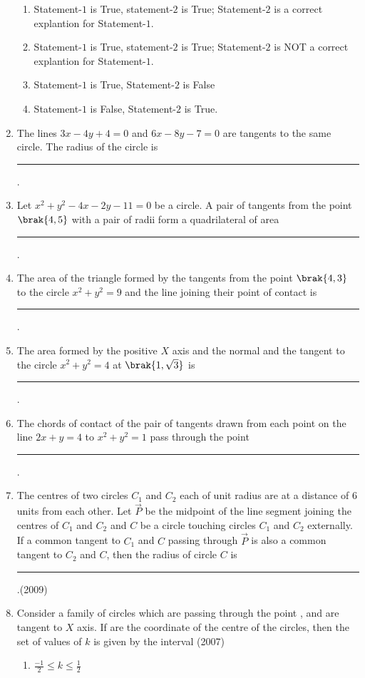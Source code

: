 \begin{enumerate}[label=\thesubsection.\arabic*.,ref=\thesubsection.\theenumi]
\begin{enumerate}
\item Statement-$1$ is True, statement-$2$ is True; Statement-$2$ is a correct explantion for Statement-$1$.
\item Statement-$1$ is True, statement-$2$ is True; Statement-$2$ is NOT a correct explantion for Statement-$1$.
\item Statement-$1$ is True,  Statement-$2$ is False
\item Statement-$1$ is False,  Statement-$2$ is True.
\end{enumerate}
%
\item The lines $3x-4y+4=0$ and $6x-8y-7=0$ are tangents to the same circle. The radius of the circle is \rule{1cm}{0.01pt}.
	\hfill{}
\item Let $x^{2}+y^{2}-4x-2y-11=0$ be a circle. A pair of tangents from the point $\brak{4, 5}$ with a pair of radii form a quadrilateral of area
\rule{1cm}{0.01pt}.
%
	\hfill{}
\item The area of the triangle formed by the tangents from the point $\brak{4, 3}$ to the circle $x^{2}+y^{2}=9$ and the line joining their point of contact is
\rule{1cm}{0.01pt}.
%
	\hfill{}
\item The area formed by the positive $X$ axis and the normal and the tangent to the circle $x^{2}+y^{2}=4$ at $\brak{1, \sqrt{3}}$ is
\rule{1cm}{0.01pt}.
%
	\hfill{}
\item The chords of contact of the pair of tangents drawn from each point on the line $2x+y=4$ to $x^{2}+y^{2}=1$ pass through the point \rule{1cm}{0.01pt}.
%
	\hfill{}
\item The centres of two circles $C_1$ and $C_2$ each of unit radius are at a distance of $6$ units from each other. Let $\vec{P}$ be the midpoint of the line segment joining the centres of $C_1$ and $C_2$ and $C$ be a circle touching circles $C_1$ and $C_2$ externally. If a common tangent to $C_1$ and $C$ passing through $\vec{P}$ is also a common tangent to $C_2$ and $C$,  then the radius of circle $C$ is  \rule{1cm}{0.01pt}.\hfill(2009)
\item Consider a family of circles which are passing through the point ,  and are tangent to $X$ axis. If  are the coordinate of the centre of the circles,  then the set of values of $k$ is given by the interval
\hfill{(2007)}
\begin{multicols}{4}
\begin{enumerate}
\item $\frac{-1}{2} \le k \le \frac{1}{2}$

\end{enumerate}
\end{multicols}
\end{enumerate}
